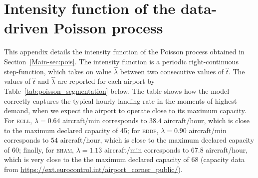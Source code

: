 \documentclass[]{elsarticle}
\newcommand{\airp}[1]{\textcolor{#1}{\textsc{#1}}}
\begin{document}

\section{Intensity function of the data-driven Poisson process}\label{sec:appd}

  This appendix details the intensity function of the Poisson process obtained in Section~\ref{Main-sec:pois}.
  The intensity function is a periodic right-continuous step-function, which takes on value \(\hat{\lambda}\) between two consecutive values of \(\hat{t}\).
  The values of \(\hat{t}\) and \(\hat{\lambda}\) are reported for each airport by Table~\ref{tab:poisson_segmentation} below.
  The table shows how the model correctly captures the typical hourly landing rate in the moments of highest demand, when we expect the airport to operate close to its maximum capacity. For \airp{egll}, \(\lambda = 0.64\) aircraft/min corresponds to \(38.4\) aircraft/hour, which is close to the maximum declared capacity of 45; for \airp{eddf}, \(\lambda = 0.90\) aircraft/min corresponds to \(54\) aircraft/hour, which is close to the maximum declared capacity of 60; finally, for \airp{eham}, \(\lambda = 1.13\) aircraft/min corresponds to \(67.8\) aircraft/hour, which is very close to the the maximum declared capacity of 68 (capacity data from \url{https://ext.eurocontrol.int/airport_corner_public/}).
\end{document}
